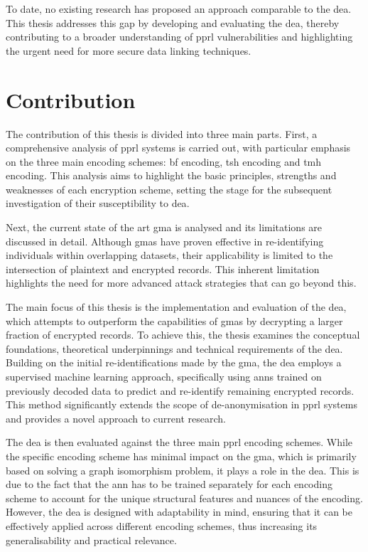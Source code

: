To date, no existing research has proposed an approach comparable to the \ac{dea}. 
This thesis addresses this gap by developing and evaluating the \ac{dea}, thereby contributing to a broader understanding of \ac{pprl} vulnerabilities and highlighting the urgent need for more secure data linking techniques.

\section{Contribution}  \label{sec:contribution}

The contribution of this thesis is divided into three main parts. 
First, a comprehensive analysis of \ac{pprl} systems is carried out, with particular emphasis on the three main encoding schemes: \ac{bf} encoding, \ac{tsh} encoding and \ac{tmh} encoding. 
This analysis aims to highlight the basic principles, strengths and weaknesses of each encryption scheme, setting the stage for the subsequent investigation of their susceptibility to \ac{dea}.

Next, the current state of the art \ac{gma} is analysed and its limitations are discussed in detail. 
Although \ac{gma}s have proven effective in re-identifying individuals within overlapping datasets, their applicability is limited to the intersection of plaintext and encrypted records. 
This inherent limitation highlights the need for more advanced attack strategies that can go beyond this.

The main focus of this thesis is the implementation and evaluation of the \ac{dea}, which attempts to outperform the capabilities of \ac{gma}s by decrypting a larger fraction of encrypted records. 
To achieve this, the thesis examines the conceptual foundations, theoretical underpinnings and technical requirements of the \ac{dea}. 
Building on the initial re-identifications made by the \ac{gma}, the \ac{dea} employs a supervised machine learning approach, specifically using \ac{ann}s trained on previously decoded data to predict and re-identify remaining encrypted records. 
This method significantly extends the scope of de-anonymisation in \ac{pprl} systems and provides a novel approach to current research.

The \ac{dea} is then evaluated against the three main \ac{pprl} encoding schemes. 
While the specific encoding scheme has minimal impact on the \ac{gma}, which is primarily based on solving a graph isomorphism problem, it plays a role in the \ac{dea}. 
This is due to the fact that the \ac{ann} has to be trained separately for each encoding scheme to account for the unique structural features and nuances of the encoding. 
However, the \ac{dea} is designed with adaptability in mind, ensuring that it can be effectively applied across different encoding schemes, thus increasing its generalisability and practical relevance.

